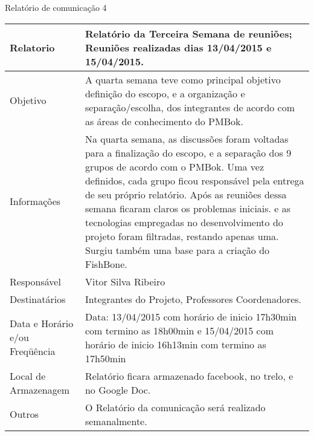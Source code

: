 \begin{center}
{\large Relatório de comunicação 4}
\begin{table}[h]
\begin{tabular}{|p{6cm}|p{9cm}|}\hline
Relatorio & Relatório da Terceira Semana de reuniões; Reuniões realizadas dias 13/04/2015 e 15/04/2015.\\ \hline
Objetivo & A quarta semana teve como principal objetivo definição do escopo, e a organização e separação/escolha, dos integrantes de acordo com as áreas de conhecimento do PMBok.\\ \hline
Informações & Na quarta semana, as discussões foram voltadas para a finalização do escopo, e a separação dos 9 grupos de acordo com o PMBok. Uma vez definidos, cada grupo ficou responsável pela entrega de seu próprio relatório.
Após as reuniões dessa semana ficaram claros os problemas iniciais. e as tecnologias empregadas no desenvolvimento do projeto foram filtradas, restando apenas uma.
Surgiu também uma base para a criação do FishBone.\\ \hline
Responsável & Vitor Silva Ribeiro\\ \hline
Destinatários & Integrantes do Projeto, Professores Coordenadores.\\ \hline
Data e Horário e/ou Freqüência & Data: 13/04/2015 com horário de inicio 17h30min com termino as 18h00min e 15/04/2015 com horário de inicio 16h13min com  termino as 17h50min\\ \hline
Local de Armazenagem & Relatório ficara armazenado facebook, no trelo, e no Google Doc.\\ \hline
Outros & O Relatório da comunicação será realizado semanalmente.\\ \hline
\end{tabular}
\end{table}

\end{center}

% 